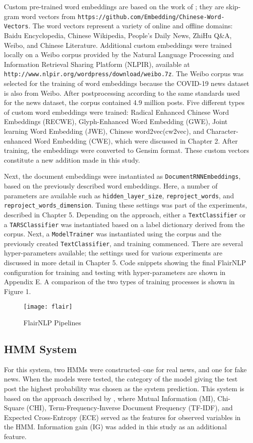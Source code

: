 \documentclass [11pt, proquest] {uwthesis}[2020/02/24]
\begin{document}
Custom pre-trained word embeddings are based on the work of \cite{Li2018}; they are skip-gram word vectors from
\texttt{https://github.com/Embedding/Chinese-Word-Vectors}. The word vectors represent a variety of online and offline domains: Baidu Encyclopedia, Chinese Wikipedia, People's Daily News, ZhiHu Q\&A, Weibo, and Chinese Literature. Additional custom embeddings were trained locally on a Weibo corpus provided by the Natural Language Processing and Information Retrieval Sharing Platform (NLPIR), available at \texttt{http://www.nlpir.org/wordpress/download/weibo.7z}.  The Weibo corpus was selected for the training of word embeddings because the COVID-19 news dataset is also from Weibo. After postprocessing according to the same standards used for the news dataset, the corpus contained 4.9 million posts. Five different types of custom word embeddings were trained: Radical Enhanced Chinese Word Embeddings (RECWE), Glyph-Enhanced Word Embedding (GWE), Joint learning Word Embedding (JWE), Chinese word2vec(cw2vec), and Character-enhanced Word Embedding (CWE), which were discussed in Chapter 2. After training, the embeddings were converted to Gensim format. These custom vectors constitute a new addition made in this study.

Next, the document embeddings were instantiated as \texttt{DocumentRNNEmbeddings}, based on the previously described word embeddings. Here, a number of parameters are available such as \texttt{hidden\_layer\_size}, \texttt{reproject\_words}, and \texttt{reproject\_words\_dimension}. Tuning these settings was part of the experiments, described in Chapter 5.  Depending on the approach, either a \texttt{TextClassifier} or a \texttt{TARSClassifier} was instantiated based on a label dictionary derived from the corpus. Next, a \texttt{ModelTrainer} was instantiated using the corpus and the previously created \texttt{TextClassifier}, and training commenced. There are several hyper-parameters available; the settings used for various experiments are discussed in more detail in Chapter 5. Code snippets showing the final FlairNLP configuration for training and testing with hyper-parameters are shown in Appendix E. A comparison of the two types of training processes is shown in Figure 1.
\begin{figure}[hbt!]
\texttt{[image: flair]}
\caption{FlairNLP Pipelines}
\end{figure}
\subsection{HMM System}
For this system, two HMMs were constructed--one for real news, and one for fake news. When the models were tested, the category of the model giving the test post the highest probability was chosen as the system prediction. This system is based on the approach described by \cite{Liu2015}, where Mutual Information (MI), Chi-Square (CHI), Term-Frequency-Inverse Document Frequency (TF-IDF), and Expected Cross-Entropy (ECE) served as the features for observed variables in the HMM. Information gain (IG) was added in this study as an additional feature.
\end{document}
